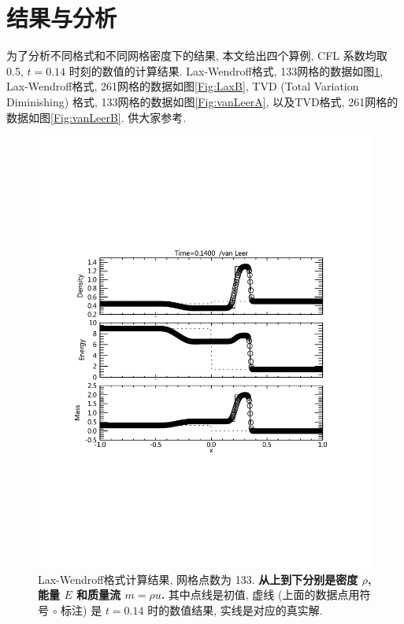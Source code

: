 \documentclass[10.5pt
]{article}
\begin{document}
\section{结果与分析}
为了分析不同格式和不同网格密度下的结果, 本文给出四个算例, CFL 系数均取0.5, $t=0.14$ 时刻的数值的计算结果. Lax-Wendroff格式, 133网格的数据如图\ref{Fig:LaxA}, Lax-Wendroff格式, 261网格的数据如图\ref{Fig:LaxB}, TVD (Total Variation Diminishing) 格式\citep{vanLeer1974,Harten1983}, 133网格的数据如图\ref{Fig:vanLeerA}, 以及TVD格式, 261网格的数据如图\ref{Fig:vanLeerB}. 供大家参考.

\begin{figure}
\begin{center}
\includegraphics[width=.85\textwidth]{fig_tvd.pdf}
\caption{Lax-Wendroff格式计算结果, 网格点数为 133. \textbf{从上到下分别是密度 $\rho$, 能量 $E$ 和质量流 $m = \rho u$.}
其中点线是初值, 虚线 (上面的数据点用符号 $\circ$ 标注) 是 $t=0.14$ 时的数值结果, 实线是对应的真实解.}\label{Fig:LaxA}
\end{center}
\end{figure}
\end{document}
